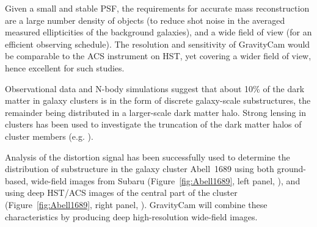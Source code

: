 \documentclass{pasa}%
\begin{document}
Given a small and stable PSF, the requirements for accurate mass reconstruction are a large number density of objects (to reduce shot noise in the averaged measured ellipticities of the background galaxies), and a wide field of view (for an efficient observing schedule). The resolution and sensitivity of \mbox{GravityCam} would be comparable to the ACS instrument on HST, yet covering a wider field of view, hence excellent for such studies. 

Observational data and N-body simulations suggest that about 10\% of the dark matter in galaxy clusters is in the form of discrete galaxy-scale substructures, the remainder being distributed in a larger-scale dark matter halo. Strong lensing in clusters has been used to investigate the truncation of the dark matter halos of cluster members (e.g. \citealt{Halkola+2007}). %

\begin{figure*}
\begin{center}
\begin{minipage}{6cm}
\centering
{}
\end{minipage}
\hspace*{3mm}
\begin{minipage}{6cm}
\centering
{}
\end{minipage}
\end{center}
\caption{Central portion of ground-based Subaru image ({\em left}) and space-based HST/ACS image ({\em right}) of Abell~1689 with contours showing the reconstructed mass distribution from distortion measurements.  Note that space-based data are high-resolution and typically deeper, whereas ground-based data typically cover a larger area (tens of arc minutes compared to a few arc minutes).}
\label{fig:Abell1689}
\end{figure*}

Analysis of the distortion signal has been successfully used to determine the distribution of substructure in the galaxy cluster Abell~1689 using both ground-based, wide-field images from Subaru (Figure~\ref{fig:Abell1689}, left panel, \citealt{Okura+2007}), and using deep HST/ACS images of the central part of the cluster (Figure~\ref{fig:Abell1689}, right panel, \citealt{Leonard+2007}).  \mbox{GravityCam} will combine these characteristics 
by producing deep high-resolution wide-field images.
\end{document}
